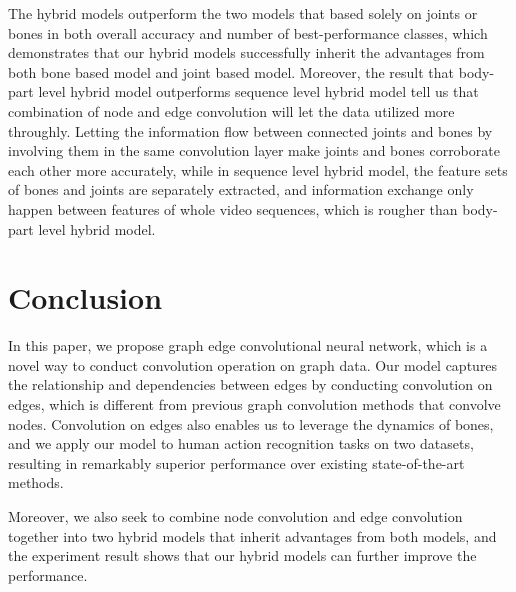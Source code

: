 \documentclass[a4paper,11pt]{article}
\begin{document}
The hybrid models outperform the two models that based solely on joints or bones in both overall accuracy and number of best-performance classes, which demonstrates that our hybrid models successfully inherit the advantages from both bone based model and joint based model.
Moreover, the result that body-part level hybrid model outperforms sequence level hybrid model tell us that combination of node and edge convolution will let the data utilized more throughly. Letting the information flow between connected joints and bones by involving them in the same convolution layer make joints and bones corroborate each other more accurately, while in sequence level hybrid model, the feature sets of bones and joints are separately extracted, and information exchange only happen between features of whole video sequences, which is rougher than body-part level hybrid model.



\section{Conclusion}
In this paper, we propose graph edge convolutional neural network, which is a novel way to conduct convolution operation on graph data. Our model captures the relationship and dependencies between edges by conducting convolution on edges, which is different from previous graph convolution methods that convolve nodes. Convolution on edges also enables us to leverage the dynamics of bones, and we apply our model to human action recognition tasks on two datasets, resulting in remarkably superior performance over existing state-of-the-art methods.

Moreover, we also seek to combine node convolution and edge convolution together into two hybrid models that inherit advantages from both models, and the experiment result shows that our hybrid models can further improve the performance.






\end{document}
